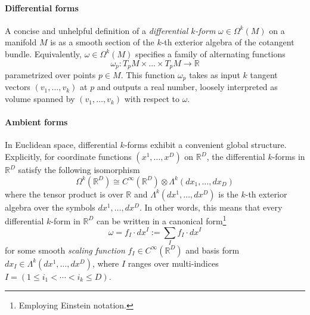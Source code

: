 \documentclass{article}
\newcommand{\R}{\mathbb{R}}
\theoremstyle{remark}
\theoremstyle{plain}
\begin{document}
\paragraph{Differential forms} A concise and unhelpful definition of a \textit{differential $k$-form} $\omega \in \Omega^k(M)$ on a manifold $M$ is as a smooth section of the $k$-th exterior algebra of the cotangent bundle. Equivalently, $\omega \in \Omega^k(M)$ specifies a family of alternating functions
\begin{equation}
    \omega_p : T_pM \times \ldots \times T_pM \to \R
\end{equation} parametrized over points $p \in M$. This function $\omega_p$ takes as input $k$  tangent vectors $(v_1, \ldots, v_k)$ at $p$ and outputs a real number, loosely interpreted as volume spanned by $(v_1, \ldots, v_k)$ with respect to $\omega$.



\paragraph{Ambient forms} In Euclidean space, differential $k$-forms exhibit a convenient global structure. Explicitly, for coordinate functions $(x^1, \ldots, x^D)$ on $\R^D$, the differential $k$-forms in $\R^D$ satisfy the following isomorphism
\begin{equation}
    \Omega^k(\R^D) \cong C^\infty(\R^D) \otimes \Lambda^k(dx_1, \ldots, dx_D)
\end{equation}  where the tensor product is over $\R$ and $\Lambda^k(dx^1, \ldots, dx^D)$ is the $k$-th exterior algebra over the symbols $dx^1, \ldots, dx^D$. In other words, this means that every differential $k$-form in $\R^D$ can be written in a canonical form\footnote{Employing Einstein notation.}
\begin{equation}
    \omega = f_I \cdot dx^I := \sum_I f_I \cdot dx^I
\end{equation} for some smooth \textit{scaling function} $f_I \in C^\infty(\R^D)$ and basis form $dx_I \in \Lambda^k(dx^1, \ldots, dx^D)$, where $I$ ranges over multi-indices $I = (1\leq i_1 < \cdots < i_k \leq D)$.
\end{document}
